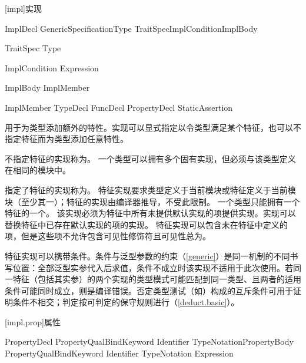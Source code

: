 
[impl]{实现}

\begin{bnf}{ImplDecl}
     GenericSpecification\bnfq Type TraitSpec\bnfq ImplCondition\bnfq ImplBody
\end{bnf}

\begin{bnf}{TraitSpec}
    \terminal{:} Type
\end{bnf}

\begin{bnf}{ImplCondition}
     Expression
\end{bnf}

\begin{bnf}{ImplBody}
    \terminal{\{} ImplMember\bnfs \terminal{\}} \br
    \terminal{;} \br
    \terminal{=}  \terminal{;}
\end{bnf}

\begin{bnf}{ImplMember}
    TypeDecl \br
    FuncDecl \br
    PropertyDecl \br
    StaticAssertion
\end{bnf}

\pnum
{}用于为类型添加额外的特性。实现可以显式指定以令类型满足某个特征，也可以不指定特征而为类型添加任意特性。

\pnum
不指定特征的实现称为。
一个类型可以拥有多个固有实现，但必须与该类型定义在相同的模块中。

\pnum
指定了特征的实现称为。
特征实现要求类型定义于当前模块或特征定义于当前模块（至少其一）；特征的实现由编译器推导，不受此限制。
一个类型只能拥有一个特征的一个。
该实现必须为特征中所有未提供默认实现的项提供实现。实现可以替换特征中已存在默认实现的项的实现。
特征实现可以包含未在特征中定义的项，但是这些项不允许包含可见性修饰符且可见性总为。

\pnum
特征实现可以携带条件。条件与泛型参数的约束（\ref{generic}）是同一机制的不同书写位置：全部泛型实参代入后求值，条件不成立时该实现不适用于此次使用。若同一特征（包括其实参）的两个实现的类型模式可能匹配到同一类型、且两者的适用条件可能同时成立，则是编译错误。否定类型测试（如）构成的互斥条件可用于证明条件不相交；判定按可判定的保守规则进行（\ref{deduct.basic}）。

[impl.prop]{属性}

\begin{bnf}{PropertyDecl}
    PropertyQual\bnfs BindKeyword Identifier TypeNotation\bnfq PropertyBody \br
    PropertyQual\bnfs BindKeyword Identifier TypeNotation\bnfq \terminal{=>} Expression \terminal{;}
\end{bnf}

